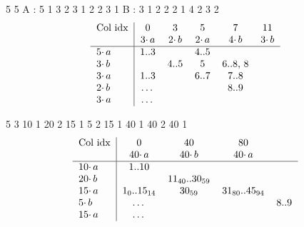 \documentclass{article}
\begin{document}
5 5 
A : 5 1  3 2   3 1   2 2   3 1
B : 3 1  2 2   2 1   4 2   3 2
\newline 
\[ \begin{tabular} {l | *{10}{c}}
Col idx & 0 & 3 & 5 & 7 & 11  \\
& $3 \cdotp a$ & $2 \cdotp b$ & $2 \cdotp a$ & $4 \cdotp b$ & $3 \cdotp b$  \\
\hline 
$5 \cdotp a$  & 1..3  &     & 4..5  &    \\
$3 \cdotp b$  &       & 4..5 &  5   & 6..8, 8 \\
$3 \cdotp a$  & 1..3  &     & 6..7 & 7..8 \\
$2 \cdotp b$  & \dots  &     &      & 8..9   \\
$3 \cdotp a$  & \dots  &     &      &    \\
\end{tabular} \]


5 3
10 1   20 2    15 1    5 2   15 1
40 1   40 2    40 1 
\newline 
\[ \begin{tabular} {l | *{10}{c}}
Col idx & 0 & 40 & 80   \\
& $40 \cdotp a$ & $40 \cdotp b$ & $40 \cdotp a$  \\
\hline 
$10 \cdotp a$  & 1..10  &     &   &    \\
$20 \cdotp b$  &       & $11_{40}$..$30_{59}$ &     &  \\
$15 \cdotp a$  & $1_{0}$..$15_{14}$  & $30_{59}$  & $31_{80}$..$45_{94}$ \\
$5 \cdotp b$  & \dots  &     &      & 8..9   \\
$15 \cdotp a$  & \dots  &     &      &    \\
\end{tabular} \]
\end{document}
